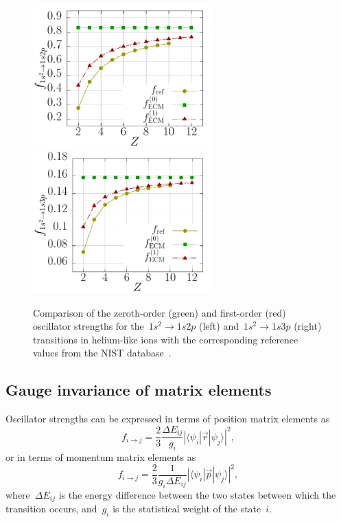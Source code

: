 \begin{figure}
    \centering
    \includegraphics[width=69mm]{Graphs/OscillatorHe1s2p.pdf}
    \includegraphics[width=69mm]{Graphs/OscillatorHe1s3p.pdf}
    \caption{Comparison of the zeroth-order (green) and first-order (red) oscillator strengths for the~$1s^2\rightarrow 1s2p$ (left) and~$1s^2\rightarrow 1s3p$ (right) transitions in helium-like ions with the corresponding reference values from the NIST database~\cite{NIST}.}
    \label{OscillatorPlot}
\end{figure}

\subsection{Gauge invariance of matrix elements}

Oscillator strengths can be expressed in terms of position matrix elements as~\cite{demtroder2002laser}
\begin{equation}
f_{i \rightarrow j} = \frac{2}{3} \frac{\Delta E_{ij}}{g_i} |\langle \psi_i|\vec{r}|\psi_j \rangle|^2 ,
\end{equation}
or in terms of momentum matrix elements as
\begin{equation}
f_{i \rightarrow j} = \frac{2}{3} \frac{1}{g_i \Delta E_{ij}} |\langle \psi_i|\vec{p}|\psi_j \rangle|^2 ,
\end{equation}
where~$\Delta E_{ij}$ is the energy difference between the two states between which the transition occurs, and~$g_i$ is the statistical weight of the state~$i$.

